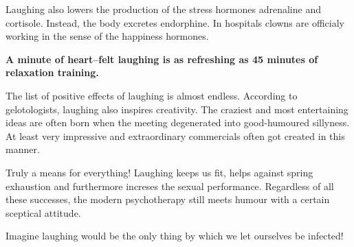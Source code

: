 \documentclass[../Book.Stress_regulation.tex]{subfiles}
\begin{document}
Laughing also lowers the production of the stress hormones adrenaline and cortisole.
Instead, the body excretes endorphine.
In hospitals clowns are officialy working in the sense of the happiness hormones.

\textbf{A minute of heart--felt laughing is as refreshing as 45 minutes of relaxation training.}

The list of positive effects of laughing is almost endless.
According to gelotologists, laughing also inspires creativity.
The craziest and most entertaining ideas are often born when the meeting degenerated into good-humoured sillyness.
At least very impressive and extraordinary commercials often got created in this manner.

Truly a means for everything!
Laughing keeps us fit, helps against spring exhaustion and furthermore increses the sexual performance.
Regardless of all these successes, the modern psychotherapy still meets humour with a certain sceptical attitude.

Imagine laughing would be the only thing by which we let ourselves be infected!
\end{document}

